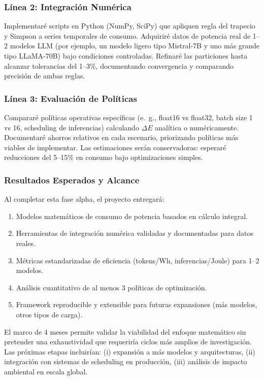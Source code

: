 \subsubsection{Línea 2: Integración Numérica}

Implementaré scripts en Python (NumPy, SciPy) que apliquen regla del trapecio y Simpson a series temporales de consumo. Adquiriré datos de potencia real de 1--2 modelos LLM (por ejemplo, un modelo ligero tipo Mistral-7B y uno más grande tipo LLaMA-70B) bajo condiciones controladas. Refinaré las particiones hasta alcanzar tolerancias del 1--3\%, documentando convergencia y comparando precisión de ambas reglas.

\subsubsection{Línea 3: Evaluación de Políticas}

Compararé políticas operativas específicas (e.~g., float16 vs float32, batch size 1 vs 16, scheduling de inferencias) calculando $\Delta E$ analítica o numéricamente. Documentaré ahorros relativos en cada escenario, priorizando políticas más viables de implementar. Las estimaciones serán conservadoras: esperaré reducciones del 5--15\% en consumo bajo optimizaciones simples.

\subsubsection{Resultados Esperados y Alcance}

Al completar esta fase alpha, el proyecto entregará:

\begin{enumerate}
    \item Modelos matemáticos de consumo de potencia basados en cálculo integral.
    \item Herramientas de integración numérica validadas y documentadas para datos reales.
    \item Métricas estandarizadas de eficiencia (tokens/Wh, inferencias/Joule) para 1--2 modelos.
    \item Análisis cuantitativo de al menos 3 políticas de optimización.
    \item Framework reproducible y extensible para futuras expansiones (más modelos, otros tipos de carga).
\end{enumerate}

El marco de 4 meses permite validar la viabilidad del enfoque matemático sin pretender una exhaustividad que requeriría ciclos más amplios de investigación. Las próximas etapas incluirían: (i) expansión a más modelos y arquitecturas, (ii) integración con sistemas de scheduling en producción, (iii) análisis de impacto ambiental en escala global.
